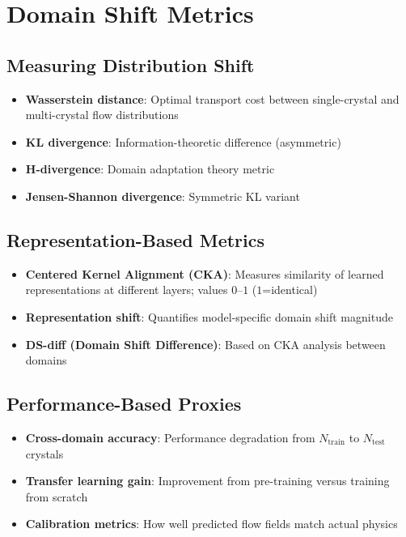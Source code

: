 \section{Domain Shift Metrics}

\subsection{Measuring Distribution Shift}
\begin{itemize}
    \item \textbf{Wasserstein distance}: Optimal transport cost between single-crystal and multi-crystal flow distributions
    \item \textbf{KL divergence}: Information-theoretic difference (asymmetric)
    \item \textbf{H-divergence}: Domain adaptation theory metric
    \item \textbf{Jensen-Shannon divergence}: Symmetric KL variant
\end{itemize}

\subsection{Representation-Based Metrics}
\begin{itemize}
    \item \textbf{Centered Kernel Alignment (CKA)}: Measures similarity of learned representations at different layers; values $0$--$1$ ($1$=identical)
    \item \textbf{Representation shift}: Quantifies model-specific domain shift magnitude
    \item \textbf{DS-diff (Domain Shift Difference)}: Based on CKA analysis between domains
\end{itemize}

\subsection{Performance-Based Proxies}
\begin{itemize}
    \item \textbf{Cross-domain accuracy}: Performance degradation from $N_{\text{train}}$ to $N_{\text{test}}$ crystals
    \item \textbf{Transfer learning gain}: Improvement from pre-training versus training from scratch
    \item \textbf{Calibration metrics}: How well predicted flow fields match actual physics
\end{itemize}

